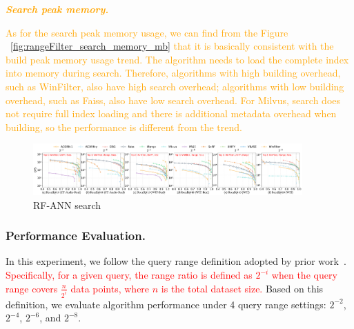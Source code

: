 \documentclass[sigconf, nonacm]{acmart}
\begin{document}
		\textit{\textbf{\textcolor{orange}{Search peak memory.}}}
		
		
		\textcolor{orange}{As for the search peak memory usage, we can find from the Figure ~\ref{fig:rangeFilter_search_memory_mb} that it is basically consistent with the build peak memory usage trend. The algorithm needs to load the complete index into memory during search. Therefore, algorithms with high building overhead, such as WinFilter, also have high search overhead; algorithms with low building overhead, such as Faiss, also have low search overhead. For Milvus, search does not require full index loading and there is additional metadata overhead when building, so the performance is different from the trend.}
		
	\begin{figure}[t]
		
		\centering
		
		\includegraphics[width=0.92\textwidth]{figures/exp/exp_8_2.pdf}
		\caption{RF-ANN search }
		\label{fig:exp_8_2}
	\end{figure}
	
	
	\subsubsection{Performance Evaluation. }
	
	In this experiment, we follow the query range definition adopted by prior work~\cite{HQI}. \textcolor{red}{Specifically, for a given query, the range ratio is defined as $2^{-i}$	when the query range covers $\frac{n}{2^i}$ data points, where $n$ is the total dataset size.} Based on this definition, we evaluate algorithm performance under 4 query range settings: $2^{-2}$, $2^{-4}$, $2^{-6}$, and $2^{-8}$. 
	
\end{document}
